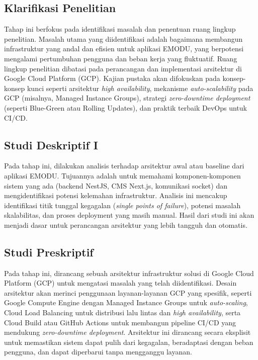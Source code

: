\subsection{Klarifikasi Penelitian}
Tahap ini berfokus pada identifikasi masalah dan penentuan ruang lingkup penelitian.
Masalah utama yang diidentifikasi adalah bagaimana membangun infrastruktur yang andal dan efisien untuk aplikasi EMODU, yang berpotensi mengalami pertumbuhan pengguna dan beban kerja yang fluktuatif.
Ruang lingkup penelitian dibatasi pada perancangan dan implementasi arsitektur di Google Cloud Platform (GCP).
Kajian pustaka akan difokuskan pada konsep-konsep kunci seperti arsitektur \textit{high availability}, mekanisme \textit{auto-scalability} pada GCP (misalnya, Managed Instance Groups), strategi \textit{zero-downtime deployment} (seperti Blue-Green atau Rolling Updates), dan praktik terbaik DevOps untuk CI/CD.

\subsection{Studi Deskriptif I}
Pada tahap ini, dilakukan analisis terhadap arsitektur awal atau baseline dari aplikasi EMODU.
Tujuannya adalah untuk memahami komponen-komponen sistem yang ada (backend NestJS, CMS Next.js, komunikasi socket) dan mengidentifikasi potensi kelemahan infrastruktur.
Analisis ini mencakup identifikasi titik tunggal kegagalan (\textit{single points of failure}), potensi masalah skalabilitas, dan proses deployment yang masih manual.
Hasil dari studi ini akan menjadi dasar untuk perancangan arsitektur yang lebih tangguh dan otomatis.

\subsection{Studi Preskriptif}
Pada tahap ini, dirancang sebuah arsitektur infrastruktur solusi di Google Cloud Platform (GCP) untuk mengatasi masalah yang telah diidentifikasi.
Desain arsitektur akan merinci penggunaan layanan-layanan GCP yang spesifik, seperti Google Compute Engine dengan Managed Instance Groups untuk \textit{auto-scaling}, Cloud Load Balancing untuk distribusi lalu lintas dan \textit{high availability}, serta Cloud Build atau GitHub Actions untuk membangun pipeline CI/CD yang mendukung \textit{zero-downtime deployment}.
Arsitektur ini dirancang secara eksplisit untuk memastikan sistem dapat pulih dari kegagalan, beradaptasi dengan beban pengguna, dan dapat diperbarui tanpa mengganggu layanan.

